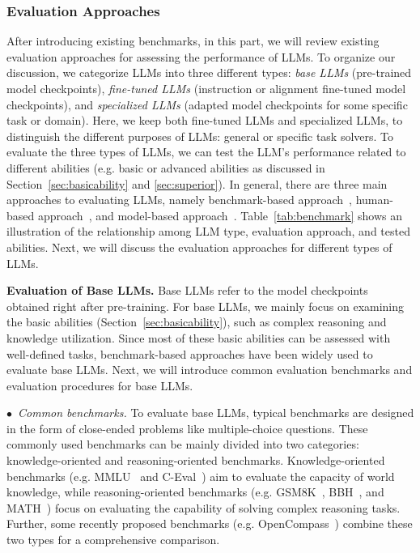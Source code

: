 {{\subsubsection{Evaluation Approaches}\label{subsec-evaapp}
After introducing existing benchmarks, in this part, we will review existing evaluation approaches for assessing the performance of LLMs. To organize our discussion, we categorize LLMs into three different types: \emph{base LLMs} (pre-trained model checkpoints), \emph{fine-tuned LLMs} (instruction or alignment fine-tuned model checkpoints), and \emph{specialized LLMs} (adapted model checkpoints for some specific task or domain). Here, we keep both fine-tuned LLMs and specialized LLMs, to distinguish the different purposes of LLMs: general or specific  task solvers. To evaluate the three types of LLMs, we can test the LLM's performance related to  different abilities (e.g. basic or advanced abilities as discussed in Section~\ref{sec:basicability} and \ref{sec:superior}).
In general, there are three main approaches to evaluating LLMs, namely benchmark-based approach~\cite{Hendrycks-ICLR-2021-Measuring}, human-based approach~\cite{Zheng-2023-arxiv-Judging}, and model-based approach~\cite{Li-2023-github-alpaca_eval}.
Table~\ref{tab:benchmark} shows an illustration of the relationship among LLM type, evaluation approach, and tested abilities. Next, we will discuss the evaluation approaches for different types of LLMs.

\textbf{Evaluation of Base LLMs.} Base LLMs refer to the model checkpoints obtained right after pre-training. For base LLMs, we mainly focus on examining the basic abilities (Section~\ref{sec:basicability}), such as complex reasoning and knowledge utilization. Since most of these basic abilities can be assessed with well-defined tasks, benchmark-based approaches have been widely used to evaluate base LLMs. Next, we will introduce common evaluation benchmarks and evaluation procedures for base LLMs.

$\bullet$~\emph{Common benchmarks.} To evaluate base LLMs, typical benchmarks are designed in the form of close-ended problems like multiple-choice questions. These commonly used benchmarks can be mainly divided into two categories: knowledge-oriented and reasoning-oriented benchmarks. Knowledge-oriented benchmarks (e.g. MMLU~\cite{Hendrycks-ICLR-2021-Measuring} and C-Eval~\cite{Huang-arxiv-2023-CEval}) aim to evaluate the capacity of world knowledge, while reasoning-oriented benchmarks (e.g. GSM8K~\cite{Gao-arxiv-2023-Human}, BBH~\cite{Suzgun-arxiv-2022-Challenging}, and MATH~\cite{Hendrycks-ICLR-2021-Measuring}) focus on evaluating the capability of solving complex reasoning tasks. Further, some recently proposed benchmarks (e.g. OpenCompass~\cite{2023opencompass}) combine these two types for a comprehensive comparison.

}}
